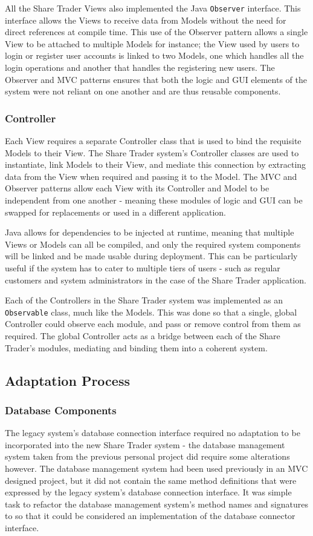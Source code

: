 \documentclass[12pt, a4paper,titlepage]{article}
\begin{document}
All the Share Trader Views also implemented the Java {\tt Observer} interface. 
This interface allows the Views to receive data from Models without the
need for direct references at compile time. 
This use of the Observer pattern allows a single View to be attached to
multiple Models for instance; the View used by users to login or register user
accounts is linked to two Models, one which handles all the login operations
and another that handles the registering new users. 
The Observer and MVC patterns ensures that both the logic and GUI elements of
the system were not reliant on one another and are thus reusable components.

\subsubsection{Controller}
Each View requires a separate Controller class that is used to bind the
requisite Models to their View. 
The Share Trader system's Controller classes are used to instantiate, link
Models to their View, and mediate this connection by extracting data from the
View when required and passing it to the Model. 
The MVC and Observer patterns allow each View with its Controller and Model to
be independent from one another - meaning these modules of logic and GUI can
be swapped for replacements or used in a different application.

Java allows for dependencies to be injected at runtime, meaning that
multiple Views or Models can all be compiled, and only the required system
components will be linked and be made usable during deployment. 
This can be particularly useful if the system has to cater to multiple tiers
of users - such as regular customers and system administrators in the case of
the Share Trader application.

Each of the Controllers in the Share Trader system was implemented as an
{\tt Observable} class, much like the Models. 
This was done so that a single, global Controller could observe each module,
and pass or remove control from them as required. 
The global Controller acts as a bridge between each of the Share Trader's
modules, mediating and binding them into a coherent system.

\subsection{Adaptation Process}
\subsubsection{Database Components}
The legacy system's database connection interface required no adaptation to be
incorporated into the new Share Trader system - the database management system
taken from the previous personal project did require some alterations however.
The database management system had been used previously in an MVC designed
project, but it did not contain the same method definitions that were
expressed by the legacy system’s database connection interface. 
It was simple task to refactor the database management system's method names
and signatures to so that it could be considered an implementation of the
database connector interface.
\end{document}
